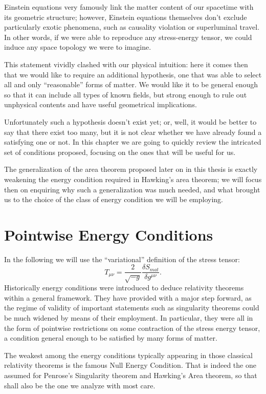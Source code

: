 Einstein equations very famously link the matter content of our spacetime with its geometric structure; however, Einstein equations themselves don't exclude particularly exotic phenomena, such as causality violation or superluminal travel. In other words, if we were able to reproduce any stress-energy tensor, we could induce any space topology we were to imagine.

This statement vividly clashed with our physical intuition: here it comes then that we would like to require an additional hypothesis, one that was able to select all and only ``reasonable'' forms of matter. We would like it to be general enough so that it can include all types of known fields, but strong enough to rule out unphysical contents and have useful geometrical implications.

Unfortunately such a hypothesis doesn't exist yet; or, well, it would be better to say that there exist too many, but it is not clear whether we have already found a satisfying one or not. In this chapter we are going to quickly review the intricated set of conditions proposed, focusing on the ones that will be useful for us. 

The generalization of the area theorem proposed later on in this thesis is exactly weakening the energy condition required in Hawking's area theorem; we will focus then on enquiring why such a generalization was much needed, and what brought us to the choice of the class of energy condition we will be employing.

\section{Pointwise Energy Conditions}
\label{sec:pointwise-energy-conditions}

In the following we will use the ``variational'' definition of the stress tensor:
\[
   T_{\mu\nu} = \frac{2}{\sqrt{-g}} \frac{\delta S_{mat}}{\delta g^{\mu\nu}}. 
\]
Historically energy conditions were introduced to deduce relativity theorems within a general framework. They have provided with a major step forward, as the regime of validity of important statements such as singularity theorems could be much widened by means of their employment. 
In particular, they were all in the form of pointwise restrictions on some contraction of the stress energy tensor, a condition general enough to be satisfied by many forms of matter.

The weakest among the energy conditions typically appearing in those classical relativity theorems is the famous Null Energy Condition. That is indeed the one assumed for Penrose's Singularity theorem and Hawking's Area theorem, so that shall also be the one we analyze with most care.


